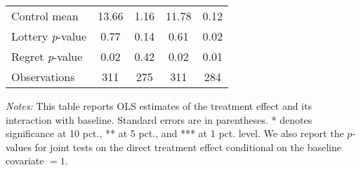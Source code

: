 \begin{table}[htbp]
{\begin{threeparttable}
\begin{tabular}{l*{4}{c}}
Control mean    &    13.66         &     1.16         &    11.78         &     0.12         \\
Lottery \emph{p}-value&     0.77         &     0.14         &     0.61         &     0.02         \\
Regret \emph{p}-value&     0.02         &     0.42         &     0.02         &     0.01         \\
Observations    &      311         &      275         &      311         &      284         \\
\bottomrule \end{tabular} \begin{tablenotes}[flushleft] \footnotesize \item \emph{Notes:} This table reports OLS estimates of the treatment effect and its interaction with baseline. Standard errors are in parentheses. * denotes significance at 10 pct., ** at 5 pct., and *** at 1 pct. level. We also report the \(p\)-values for joint tests on the direct treatment effect conditional on the baseline covariate $= 1$. \end{tablenotes} \end{threeparttable} } \end{table}
